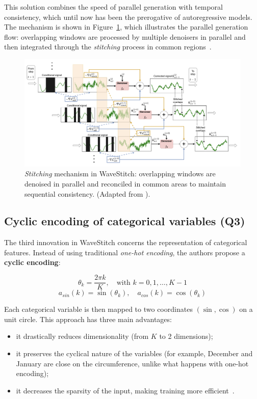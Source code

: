 This solution combines the speed of parallel generation with temporal consistency, which until now has been the prerogative of autoregressive models.  
The mechanism is shown in Figure~\ref{fig:stitching_paper}, which illustrates the parallel generation flow: overlapping windows are processed by multiple denoisers in parallel and then integrated through the \emph{stitching} process in common regions~\cite{wavestitch}.

\begin{figure}[H]
\centering
    \includegraphics[width=\textwidth]{images/stitchComplex.png}
    \caption{\emph{Stitching} mechanism in WaveStitch: overlapping windows are denoised in parallel and reconciled in common areas to maintain sequential consistency. (Adapted from \cite{wavestitch}).}
    \label{fig:stitching_paper}
\end{figure}

\subsection{Cyclic encoding of categorical variables (Q3)}
The third innovation in WaveStitch concerns the representation of categorical features.  
Instead of using traditional \emph{one-hot encoding}, the authors propose a \textbf{cyclic encoding}:

\[
\theta_k = \frac{2\pi k}{K}, \quad
\text{with } k = 0,1,\dots,K-1
\]
\[
a_{sin}(k) = \sin(\theta_k), \quad a_{cos}(k) = \cos(\theta_k)
\]

Each categorical variable is then mapped to two coordinates $(\sin, \cos)$ on a unit circle.  
This approach has three main advantages:  
\begin{itemize}
    \item it drastically reduces dimensionality (from $K$ to 2 dimensions);  
    \item it preserves the cyclical nature of the variables (for example, December and January are close on the circumference, unlike what happens with one-hot encoding);  
    \item it decreases the sparsity of the input, making training more efficient~\cite{wavestitch}.  
\end{itemize}

